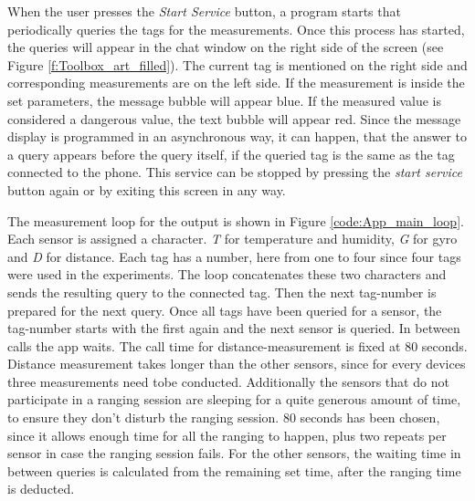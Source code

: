 When the user presses the \textit{Start Service} button, a program starts that periodically queries the tags for the measurements.
Once this process has started, the queries will appear in the chat window on the right side of the screen (see Figure \ref{f:Toolbox_art_filled}).
The current tag is mentioned on the right side and corresponding measurements are on the left side.
If the measurement is inside the set parameters, the message bubble will appear blue.
If the measured value is considered a dangerous value, the text bubble will appear red.
Since the message display is programmed in an asynchronous way, it can happen, that the answer to a query appears before the query itself, if the queried tag is the same as the tag connected to the phone.
This service can be stopped by pressing the \textit{start service} button again or by exiting this screen in any way.

The measurement loop for the output is shown in Figure \ref{code:App_main_loop}.
Each sensor is assigned a character.
\textit{T} for temperature and humidity, \textit{G} for gyro and \textit{D} for distance.
Each tag has a number, here from one to four since four tags were used in the experiments.
The loop concatenates these two characters and sends the resulting query to the connected tag.
Then the next tag-number is prepared for the next query.
Once all tags have been queried for a sensor, the tag-number starts with the first again and the next sensor is queried.
In between calls the app waits.
The call time for distance-measurement is fixed at 80 seconds.
Distance measurement takes longer than the other sensors, since for every devices three measurements need tobe conducted.
Additionally the sensors that do not participate in a ranging session are sleeping for a quite generous amount of time, to ensure they don't disturb the ranging session.
80 seconds has been chosen, since it allows enough time for all the ranging to happen, plus two repeats per sensor in case the ranging session fails.
For the other sensors, the waiting time in between queries is calculated from the remaining set time, after the ranging time is deducted.

